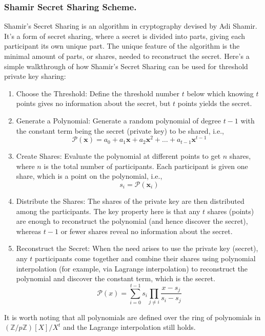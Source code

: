 \documentclass[11pt]{article}
\begin{document}
\subsubsection{Shamir Secret Sharing Scheme.}
Shamir's Secret Sharing is an algorithm in cryptography devised by Adi Shamir. It's a form of secret sharing, where a secret is divided into parts, giving each participant its own unique part. The unique feature of the algorithm is the minimal amount of parts, or shares, needed to reconstruct the secret.
Here's a simple walkthrough of how Shamir's Secret Sharing can be used for threshold private key sharing:
\begin{enumerate}
\item Choose the Threshold: Define the threshold number $t$ below which knowing $t$ points gives no information about the secret, but $t$ points yields the secret.
\item Generate a Polynomial: Generate a random polynomial of degree $t-1$ with the constant term being the secret (private key) to be shared, i.e., \begin{equation}\mathcal{P}(\mathbf{x})=a_0+a_1\mathbf{x}+a_2\mathbf{x}^2+\ldots+a_{t-1}\mathbf{x}^{t-1}
\end{equation}
\item Create Shares: Evaluate the polynomial at different points to get $n$ shares, where $n$ is the total number of participants. Each participant is given one share, which is a point on the polynomial, i.e., \begin{equation}s_i=\mathcal{P}(\mathbf{x}_i)\end{equation}
\item Distribute the Shares: The shares of the private key are then distributed among the participants.
The key property here is that any $t$ shares (points) are enough to reconstruct the polynomial (and hence discover the secret), whereas $t-1$ or fewer shares reveal no information about the secret.
\item Reconstruct the Secret: When the need arises to use the private key (secret), any $t$ participants come together and combine their shares using polynomial interpolation (for example, via Lagrange interpolation) to reconstruct the polynomial and discover the constant term, which is the secret.
\begin{equation}
\mathcal{P}(x)=\sum^{t-1}_{i=0}s_i\prod_{j\neq i}\frac{x-s_j}{s_i-s_j}
\end{equation}

\end{enumerate}
It is worth noting that all polynomials are defined over the ring of polynomials in $(\mathbb{Z}/p\mathbb{Z})[X]/X^{t}$ and the Lagrange interpolation still holds.
\end{document}
